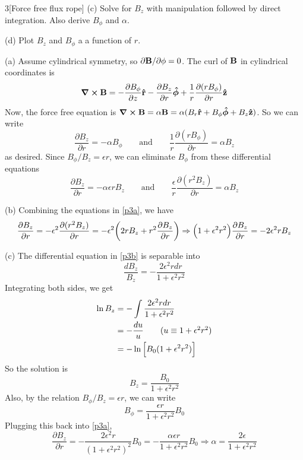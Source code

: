 \documentclass[12pt]{article}
\begin{document}
\begin{problem}{3}[Force free flux rope]
(c) Solve for $B_z$ with manipulation followed by direct integration. Also
derive $B_\phi$ and $\alpha$.

(d) Plot $B_z$ and $B_\phi$ a a function of $r$.
\begin{solution}
(a) Assume cylindrical symmetry, so $\partial\vb{B}/\partial\phi=0$. The curl of
$\vb{B}$ in cylindrical coordinates is
\begin{equation}
    \curl{\vb{B}}=-\frac{\partial B_\phi}{\partial z}\vb{\hat{r}}
    -\frac{\partial B_z}{\partial r}\bm{\hat{\phi}}
    +\frac1r\frac{\partial(rB_\phi)}{\partial r}\vb{\hat{z}}
\end{equation}
Now, the force free equation is
$\curl{\vb{B}}=\alpha\vb{B}=\alpha(B_r\vb{\hat{r}}+B_\phi\bm{\hat{\phi}}+B_z\vb{\hat{z}})$. So we can 
write
\begin{equation}
    \frac{\partial B_z}{\partial r}=-\alpha B_\phi
    \qquad\text{and}\qquad
    \frac1r\frac{\partial(r B_\phi)}{\partial r}=\alpha B_z
\end{equation}
as desired. Since $B_\phi /B_z=\epsilon r$, we can eliminate $B_\phi$ from these
differential equations
\begin{equation}\label{p3a}
    \frac{\partial B_z}{\partial r}=-\alpha\epsilon rB_z
    \qquad\text{and}\qquad
    \frac{\epsilon}{r}\frac{\partial(r^2B_z)}{\partial r}=\alpha B_z
\end{equation}

(b) Combining the equations in \eqref{p3a}, we have
\begin{equation}\label{p3b}
    \frac{\partial B_z}{\partial r}=-\epsilon^2\frac{\partial
    (r^2B_z)}{\partial r}=-\epsilon^2\qty(2rB_z+r^2\frac{\partial
B_z}{\partial r})\Rightarrow
\qty(1+\epsilon^2r^2)\frac{\partial B_z}{\partial r}=-2\epsilon^2rB_z
\end{equation}

(c) The differential equation in \eqref{p3b} is separable into
\begin{equation}
    \frac{dB_z}{B_z}=-\frac{2\epsilon^2rdr}{1+\epsilon^2r^2} 
\end{equation}
Integrating both sides, we get
\begin{align}
    \ln B_z
    &=-\int\frac{2\epsilon^2rdr}{1+\epsilon^2r^2}\notag\\
    &=-\frac{du}{u}\tag{$u\equiv 1+\epsilon^2r^2$}\\
    &=-\ln\qty[B_0(1+\epsilon^2r^2)] 
\end{align}
So the solution is
\begin{equation}
    B_z=\frac{B_0}{1+\epsilon^2r^2} 
\end{equation}
Also, by the relation $B_\phi /B_z=\epsilon r$, we can write
\begin{equation}
    B_\phi=\frac{\epsilon r}{1+\epsilon^2r^2}B_0 
\end{equation}
Plugging this back into \eqref{p3a},
\begin{equation}
    \frac{\partial B_z}{\partial
    r}=-\frac{2\epsilon^2r}{(1+\epsilon^2r^2)^2}B_0
    =-\frac{\alpha\epsilon r}{1+\epsilon^2r^2}B_0
    \Rightarrow
    \alpha=\frac{2\epsilon}{1+\epsilon^2r^2}
\end{equation}


\end{solution}
\end{problem}
\end{document}
